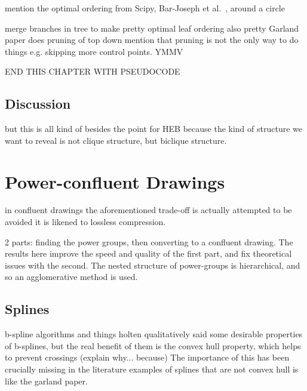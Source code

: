 mention the optimal ordering from Scipy, Bar-Joseph et al.~\cite{Bar-Joseph2001}, around a circle

merge branches in tree to make pretty
optimal leaf ordering also pretty
Garland paper does pruning of top down
mention that pruning is not the only way to do things e.g. skipping more control points. YMMV

END THIS CHAPTER WITH PSEUDOCODE

\subsection{Discussion}
but this is all kind of besides the point for HEB because the kind of structure we want to reveal is not clique structure, but biclique structure.

\section{Power-confluent Drawings}
in confluent drawings the aforementioned trade-off is actually attempted to be avoided
it is likened to lossless compression.

2 parts: finding the power groups, then converting to a confluent drawing. The results here improve the speed and quality of the first part, and fix theoretical issues with the second.
The nested structure of power-groups is hierarchical, and so an agglomerative method is used.
\subsection{Splines}
b-spline algorithms and things
holten qualitatively said some desirable properties of b-splines, but the real benefit of them is the convex hull property, which helps to prevent crossings (explain why... because)
The importance of this has been crucially missing in the literature
examples of splines that are not convex hull is like the garland paper.
